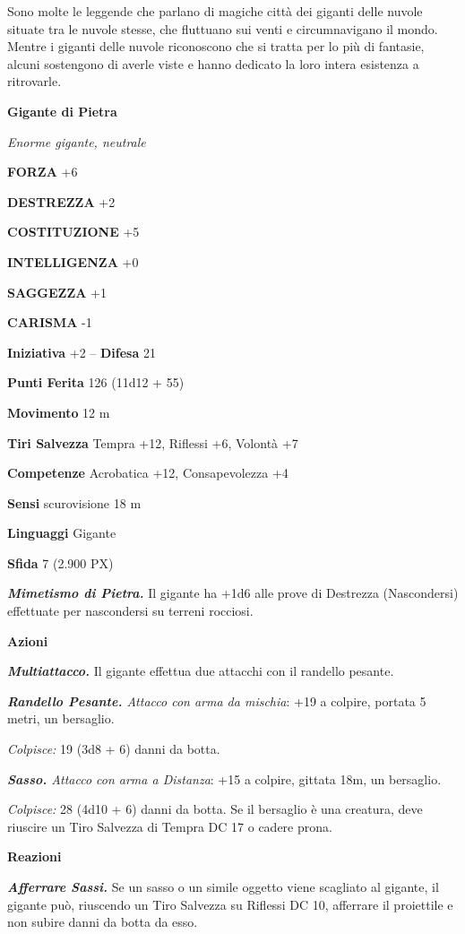\begin{multicols}{2}
	Sono molte le leggende che parlano di magiche città dei giganti delle nuvole situate tra le nuvole stesse, che fluttuano sui venti e circumnavigano il mondo. Mentre i giganti delle nuvole riconoscono che si tratta per lo più di fantasie, alcuni sostengono di averle viste e hanno dedicato la loro intera esistenza a ritrovarle.


	\medskip{}\textbf{Gigante di Pietra}

	\textit{Enorme gigante, neutrale}

	\textbf{FORZA} +6

	\textbf{DESTREZZA} +2

	\textbf{COSTITUZIONE} +5

	\textbf{INTELLIGENZA} +0

	\textbf{SAGGEZZA} +1

	\textbf{CARISMA} -1

	\textbf{Iniziativa} +2 -- \textbf{Difesa} 21

	\textbf{Punti Ferita} 126 (11d12 + 55)

	\textbf{Movimento} 12 m

	\textbf{Tiri Salvezza} Tempra +12, Riflessi +6, Volontà +7

	\textbf{Competenze} Acrobatica +12, Consapevolezza +4

	\textbf{Sensi} scurovisione 18 m

	\textbf{Linguaggi} Gigante

	\textbf{Sfida} 7 (2.900 PX)

	\textit{\textbf{Mimetismo di Pietra.}} Il gigante ha +1d6 alle prove di Destrezza (Nascondersi) effettuate per nascondersi su terreni rocciosi.

	\textbf{Azioni}

	\textit{\textbf{Multiattacco.}} Il gigante effettua due attacchi con il randello pesante.

	\textit{\textbf{Randello Pesante.} Attacco con arma da mischia}: +19 a colpire, portata 5 metri, un bersaglio.

	\textit{Colpisce:} 19 (3d8 + 6) danni da botta.

	\textit{\textbf{Sasso.} Attacco con arma a Distanza}: +15 a colpire, gittata 18m, un bersaglio.

	\textit{Colpisce:} 28 (4d10 + 6) danni da botta. Se il bersaglio è una creatura, deve riuscire un Tiro Salvezza di Tempra DC 17 o cadere prona.

	\textbf{Reazioni}

	\textit{\textbf{Afferrare Sassi.}} Se un sasso o un simile oggetto viene scagliato al gigante, il gigante può, riuscendo un Tiro Salvezza su Riflessi DC 10, afferrare il proiettile e non subire danni da botta da esso.


\end{multicols}
